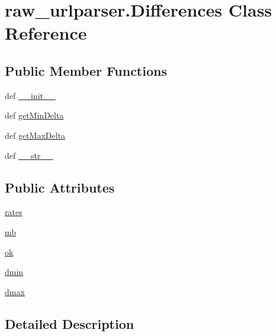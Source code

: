 \hypertarget{classraw__urlparser_1_1_differences}{\section{raw\-\_\-urlparser.\-Differences Class Reference}
\label{classraw__urlparser_1_1_differences}
}
\subsection*{Public Member Functions}
\begin{DoxyCompactItemize}
\item 
def \hyperlink{classraw__urlparser_1_1_differences_a9aa766af44c2b787343ffcbf466e1a83}{\-\_\-\-\_\-init\-\_\-\-\_\-}
\item 
def \hyperlink{classraw__urlparser_1_1_differences_ab80ae6b8351413164c04cda59d316a31}{get\-Min\-Delta}
\item 
def \hyperlink{classraw__urlparser_1_1_differences_a6cad9a98b3d3c48b41d752b6bce8776e}{get\-Max\-Delta}
\item 
def \hyperlink{classraw__urlparser_1_1_differences_a1db8d30e42716215ae4348c8182c3b7a}{\-\_\-\-\_\-str\-\_\-\-\_\-}
\end{DoxyCompactItemize}
\subsection*{Public Attributes}
\begin{DoxyCompactItemize}
\item 
\hyperlink{classraw__urlparser_1_1_differences_ad4e7eadb659a1cdcba90793cc52af174}{rates}
\item 
\hyperlink{classraw__urlparser_1_1_differences_ab4c3073b8c569b7791ab3b8e21e9b364}{mb}
\item 
\hyperlink{classraw__urlparser_1_1_differences_a46fe97bedb977585a0b27d7408ace118}{ok}
\item 
\hyperlink{classraw__urlparser_1_1_differences_af8457a8e542de086595e7fbbffdf713c}{dmin}
\item 
\hyperlink{classraw__urlparser_1_1_differences_ad2b06158b655136bc7743dc6ac8d1e2a}{dmax}
\end{DoxyCompactItemize}


\subsection{Detailed Description}


